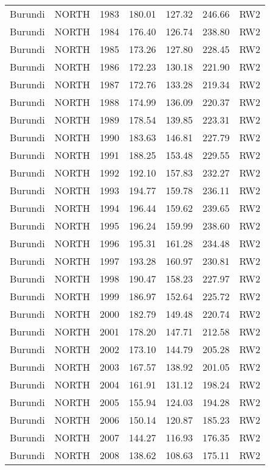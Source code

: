 \begin{longtable}{lllrrrl}
  Burundi & NORTH & 1983 & 180.01 & 127.32 & 246.66 & RW2 \\ 
  Burundi & NORTH & 1984 & 176.40 & 126.74 & 238.80 & RW2 \\ 
  Burundi & NORTH & 1985 & 173.26 & 127.80 & 228.45 & RW2 \\ 
  Burundi & NORTH & 1986 & 172.23 & 130.18 & 221.90 & RW2 \\ 
  Burundi & NORTH & 1987 & 172.76 & 133.28 & 219.34 & RW2 \\ 
  Burundi & NORTH & 1988 & 174.99 & 136.09 & 220.37 & RW2 \\ 
  Burundi & NORTH & 1989 & 178.54 & 139.85 & 223.31 & RW2 \\ 
  Burundi & NORTH & 1990 & 183.63 & 146.81 & 227.79 & RW2 \\ 
  Burundi & NORTH & 1991 & 188.25 & 153.48 & 229.55 & RW2 \\ 
  Burundi & NORTH & 1992 & 192.10 & 157.83 & 232.27 & RW2 \\ 
  Burundi & NORTH & 1993 & 194.77 & 159.78 & 236.11 & RW2 \\ 
  Burundi & NORTH & 1994 & 196.44 & 159.62 & 239.65 & RW2 \\ 
  Burundi & NORTH & 1995 & 196.24 & 159.99 & 238.60 & RW2 \\ 
  Burundi & NORTH & 1996 & 195.31 & 161.28 & 234.48 & RW2 \\ 
  Burundi & NORTH & 1997 & 193.28 & 160.97 & 230.81 & RW2 \\ 
  Burundi & NORTH & 1998 & 190.47 & 158.23 & 227.97 & RW2 \\ 
  Burundi & NORTH & 1999 & 186.97 & 152.64 & 225.72 & RW2 \\ 
  Burundi & NORTH & 2000 & 182.79 & 149.48 & 220.74 & RW2 \\ 
  Burundi & NORTH & 2001 & 178.20 & 147.71 & 212.58 & RW2 \\ 
  Burundi & NORTH & 2002 & 173.10 & 144.79 & 205.28 & RW2 \\ 
  Burundi & NORTH & 2003 & 167.57 & 138.92 & 201.05 & RW2 \\ 
  Burundi & NORTH & 2004 & 161.91 & 131.12 & 198.24 & RW2 \\ 
  Burundi & NORTH & 2005 & 155.94 & 124.03 & 194.28 & RW2 \\ 
  Burundi & NORTH & 2006 & 150.14 & 120.87 & 185.23 & RW2 \\ 
  Burundi & NORTH & 2007 & 144.27 & 116.93 & 176.35 & RW2 \\ 
  Burundi & NORTH & 2008 & 138.62 & 108.63 & 175.11 & RW2 \\ 

\end{longtable}
